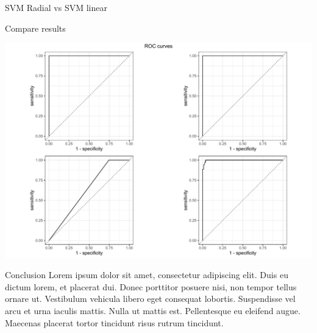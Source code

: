 \documentclass[
  ignorenonframetext,
]{article}
\begin{document}
\begin{frame}[fragile]{SVM Radial vs SVM linear}
\begin{block}{Compare results}
\begin{center}\includegraphics{_main_files/figure-beamer/unnamed-chunk-73-1} \end{center}
\end{block}

\begin{block}{Conclusion}
\protect\hypertarget{conclusion-4}{}
Lorem ipsum dolor sit amet, consectetur adipiscing elit. Duis eu dictum lorem, et placerat dui. Donec porttitor posuere nisi, non tempor tellus ornare ut. Vestibulum vehicula libero eget consequat lobortis. Suspendisse vel arcu et urna iaculis mattis. Nulla ut mattis est. Pellentesque eu eleifend augue. Maecenas placerat tortor tincidunt risus rutrum tincidunt.
\end{block}
\end{frame}
\end{document}
